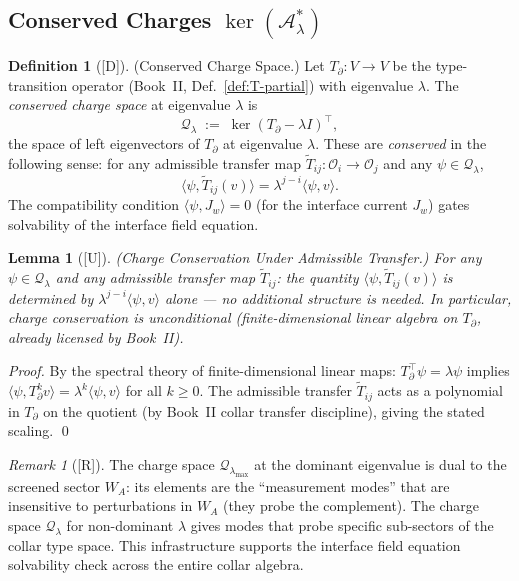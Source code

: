 \documentclass[12pt,oneside]{amsbook}
\theoremstyle{plain}
\newtheorem{lemma}[theorem]{Lemma}
\theoremstyle{definition}
\newtheorem{definition}[theorem]{Definition}
\theoremstyle{remark}
\newtheorem{remark}[theorem]{Remark}
\newcommand{\status}[1]{\textup{[#1]}}
\begin{document}
\subsection{Conserved Charges $\ker(\mathcal{A}_\lambda^*)$}

\begin{definition}[\status{D}]\label{def:conserved-charges}
\textup{(Conserved Charge Space.)}
Let $T_\partial : V \to V$ be the type-transition operator
(Book~II, Def.~\ref{def:T-partial}) with eigenvalue $\lambda$.
The \emph{conserved charge space} at eigenvalue $\lambda$ is
\[
  \mathcal{Q}_\lambda \;:=\; \ker(T_\partial - \lambda I)^{\!\top},
\]
the space of left eigenvectors of $T_\partial$ at eigenvalue $\lambda$.
These are \emph{conserved} in the following sense: for any admissible
transfer map $\tilde T_{ij} : \mathcal{O}_i \to \mathcal{O}_j$ and
any $\psi \in \mathcal{Q}_\lambda$,
\[
  \langle \psi, \tilde T_{ij}(v) \rangle = \lambda^{j-i}
  \langle \psi, v \rangle.
\]
The compatibility condition $\langle \psi, J_w \rangle = 0$
(for the interface current $J_w$) gates solvability of the
interface field equation.
\end{definition}

\begin{lemma}[\status{U}]\label{lem:charge-conservation}
\textup{(Charge Conservation Under Admissible Transfer.)}
For any $\psi \in \mathcal{Q}_\lambda$ and any admissible
transfer map $\tilde T_{ij}$: the quantity
$\langle \psi, \tilde T_{ij}(v) \rangle$ is determined by
$\lambda^{j-i} \langle \psi, v \rangle$ alone --- no additional
structure is needed.  In particular, charge conservation is
unconditional (finite-dimensional linear algebra on $T_\partial$,
already licensed by Book~II).
\end{lemma}

\begin{proof}
By the spectral theory of finite-dimensional linear maps:
$T_\partial^{\top} \psi = \lambda \psi$ implies
$\langle \psi, T_\partial^k v \rangle = \lambda^k \langle \psi, v \rangle$
for all $k \geq 0$.  The admissible transfer $\tilde T_{ij}$ acts
as a polynomial in $T_\partial$ on the quotient (by Book~II collar
transfer discipline), giving the stated scaling. \qed
\end{proof}

\begin{remark}[\status{R}]
The charge space $\mathcal{Q}_{\lambda_{\max}}$ at the dominant
eigenvalue is dual to the screened sector $W_A$: its elements are
the ``measurement modes'' that are insensitive to perturbations
in $W_A$ (they probe the complement).  The charge space
$\mathcal{Q}_\lambda$ for non-dominant $\lambda$ gives modes
that probe specific sub-sectors of the collar type space.
This infrastructure supports the interface field equation
solvability check across the entire collar algebra.
\end{remark}
\end{document}
